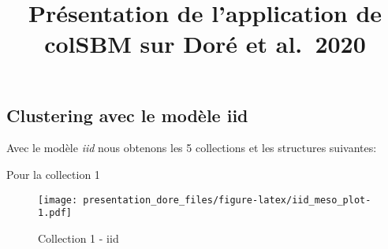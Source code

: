 \documentclass[
]{article}
\title{Présentation de l'application de colSBM sur Doré et al.~2020}
\author{}
\date{\vspace{-2.5em}}
\begin{document}
\maketitle

\hypertarget{clustering-avec-le-moduxe8le-iid}{%
\subsection{Clustering avec le modèle
iid}\label{clustering-avec-le-moduxe8le-iid}}

Avec le modèle \emph{iid} nous obtenons les 5 collections et les
structures suivantes:

Pour la collection 1

\begin{figure}
\centering
\texttt{[image: presentation\_dore\_files/figure-latex/iid\_meso\_plot-1.pdf]}
\caption{Collection 1 - iid}
\end{figure}
\end{document}

